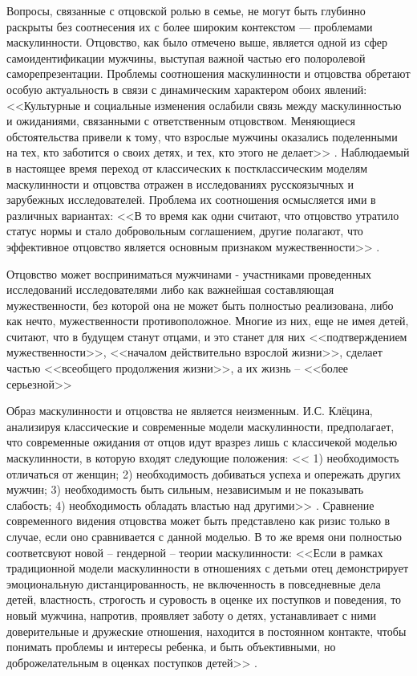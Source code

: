 \documentclass{../../common/thesisbyxetex}
\begin{document}
Вопросы, связанные с отцовской ролью в семье, не могут быть глубинно раскрыты без
соотнесения их с более широким контекстом --- проблемами маскулинности. Отцовство, как было
отмечено выше, является одной из сфер самоидентификации мужчины, выступая
важной частью его полоролевой саморепрезентации. Проблемы соотношения маскулинности и отцовства
обретают особую актуальность в связи с динамическим характером обоих явлений: <<Культурные и
социальные изменения ослабили связь между маскулинностью и ожиданиями, связанными с ответственным
отцовством. Меняющиеся обстоятельства привели к тому, что взрослые мужчины оказались поделенными
на тех, кто заботится о своих детях, и тех, кто этого не делает>> \cite[132]{f21}. Наблюдаемый в
настоящее время переход от классических к постклассическим моделям маскулинности и отцовства
отражен в исследованиях русскоязычных и зарубежных исследователей. Проблема их соотношения
осмысляется ими в различных вариантах: <<В то время как одни считают, что отцовство утратило
статус нормы и стало добровольным соглашением, другие полагают, что эффективное отцовство является
основным признаком мужественности>> \cite[132]{f21}.

Отцовство может восприниматься мужчинами - участниками проведенных
исследований исследователями либо как важнейшая составляющая
мужественности, без которой она не может быть полностью реализована, либо как нечто, мужественности
противоположное. Многие из них, еще не имея детей, считают, что в будущем станут отцами, и это
станет для них <<подтверждением мужественности>>, <<началом действительно взрослой жизни>>, сделает
частью <<всеобщего продолжения жизни>>, а их жизнь -- <<более серьезной>> \cite[367]{tri}

Образ маскулинности и отцовства не является неизменным. И.С. Клёцина, анализируя
классические и современные модели маскулинности, предполагает, что современные ожидания от отцов
идут вразрез лишь с классичекой моделью маскулинности, в которую входят следующие положения:
<< 1) необходимость отличаться от женщин; 2)
необходимость добиваться успеха и опережать других мужчин; 3) необходимость быть сильным,
независимым и не показывать слабость; 4) необходимость обладать властью над другими>> \cite{clec}.
Сравнение современного видения отцовства может быть представлено как ризис только в случае, если
оно сравнивается с данной моделью.
В то же время они полностью соответсвуют новой -- гендерной -- теории маскулинности: <<Если в рамках
традиционной модели маскулинности в отношениях с детьми отец демонстрирует эмоциональную
дистанцированность, не включенность в повседневные дела детей, властность, строгость и суровость в
оценке их поступков и поведения, то новый мужчина, напротив, проявляет заботу о детях, устанавливает
с ними доверительные и дружеские отношения, находится в постоянном контакте, чтобы понимать проблемы
и интересы ребенка, и быть объективными, но доброжелательным в оценках поступков детей>>
\cite{clec}.
\end{document}
